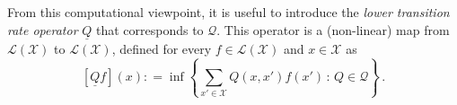 \documentclass[twoside,11pt]{article}
\newcommand{\states}{\mathcal{X}}
\newcommand{\gambles}{\mathcal{L}}
\newcommand{\gamblesX}{\gambles(\states)}
\newcommand{\rateset}{\mathcal{Q}}
\newcommand{\lrate}{\underline{Q}}
\newcommand{\coloneqq}{:\!=}
\begin{document}
From this computational viewpoint, it is useful to introduce the \emph{lower transition rate operator} $\lrate$ that corresponds to $\rateset$. This operator is a (non-linear) map from $\gamblesX$ to $\gamblesX$, defined for every $f\in\gamblesX$ and  $x\in\states$ as
\begin{equation}\label{eq:lower_rate_is_inf}
\left[\lrate f\right](x) \coloneqq \inf\left\{ \sum_{x'\in\states}Q(x,x')f(x')\,:\, Q\in\rateset \right\}\,.
\end{equation}
\end{document}
